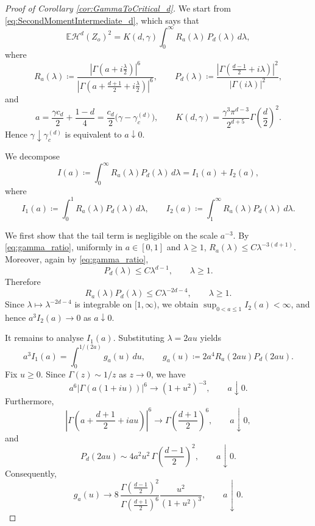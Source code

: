 \documentclass[10pt,a4paper]{amsart}
\def\EE{\mathbb{E}}
\def\cH{\mathcal{H}}
\begin{document}
\begin{proof}[Proof of Corollary \ref{cor:GammaToCritical_d}]
	 We start from \eqref{eq:SecondMomentIntermediate_d}, which says that
	\[
	\EE\cH^d(Z_o)^2
	=
	K(d,\gamma)\int_0^\infty R_a(\lambda)\,P_d(\lambda)\,d\lambda,
	\]
	where
	\[
	R_a(\lambda)\coloneqq
	\frac{\left| \Gamma\left(a + i\frac{\lambda}{2}\right) \right|^6}{
		\left| \Gamma\left(a + \frac{d+1}{2} + i\frac{\lambda}{2}\right) \right|^6},
	\qquad
	P_d(\lambda)\coloneqq
	\frac{\left| \Gamma\left(\frac{d-1}{2} + i\lambda\right) \right|^2}{
		\left| \Gamma(i\lambda) \right|^2},
	\]
	and
	\[
	a=\frac{\gamma c_d}{2}+\frac{1-d}{4}
	=\frac{c_d}{2}\bigl(\gamma-\gamma_c^{(d)}\bigr),
	\qquad
	K(d,\gamma)=\frac{\gamma^3\pi^{d-3}}{2^{d+5}}\Gamma\!\left(\frac d2\right)^2.
	\]
	Hence \(\gamma\downarrow \gamma_c^{(d)}\) is equivalent to \(a\downarrow 0\).

	We decompose
	\[
	I(a)\coloneqq\int_0^\infty R_a(\lambda)P_d(\lambda)\,d\lambda
	= I_1(a)+I_2(a),
	\]
	where
	\[
	I_1(a)\coloneqq\int_0^1 R_a(\lambda)P_d(\lambda)\,d\lambda,
	\qquad
	I_2(a)\coloneqq\int_1^\infty R_a(\lambda)P_d(\lambda)\,d\lambda.
	\]

	We first show that the tail term is negligible on the scale \(a^{-3}\).
	By \eqref{eq:gamma_ratio}, uniformly in \(a\in[0,1]\) and \(\lambda\ge1\),
	$
	R_a(\lambda)
	\le C \lambda^{-3(d+1)}
	$.	Moreover, again by \eqref{eq:gamma_ratio},
	\[
	P_d(\lambda)\le C\lambda^{d-1},\qquad \lambda\ge1.
	\]
	Therefore
	\[
	R_a(\lambda)P_d(\lambda)\le C\lambda^{-2d-4},\qquad \lambda\ge1.
	\]
	Since \(\lambda\mapsto \lambda^{-2d-4}\) is integrable on \([1,\infty)\), we obtain
	$\sup_{0<a\le1} I_2(a)<\infty$,
	and hence $a^3 I_2(a)\longrightarrow 0$ as $a\downarrow0$.

	It remains to analyse \(I_1(a)\). Substituting \(\lambda=2au\) yields
	\[
	a^3 I_1(a)=\int_0^{1/(2a)} g_a(u)\,du,
	\qquad
	g_a(u)\coloneqq 2a^4R_a(2au)P_d(2au).
	\]
	Fix \(u\ge0\). Since \(\Gamma(z)\sim 1/z\) as \(z\to0\), we have
	\[
	a^6\bigl|\Gamma(a(1+iu))\bigr|^6\longrightarrow (1+u^2)^{-3}, \qquad a\downarrow 0.
	\]
	Furthermore,
	\[
	\left|\Gamma\!\left(a+\frac{d+1}{2}+iau\right)\right|^6
	\longrightarrow
	\Gamma\!\left(\frac{d+1}{2}\right)^6, \qquad a\downarrow 0,
	\]
	and
	\[
	P_d(2au)\sim 4a^2u^2\,\Gamma\!\left(\frac{d-1}{2}\right)^2,\qquad a\downarrow 0.
	\]
	Consequently,
	\[
	g_a(u)\longrightarrow
	8\,\frac{\Gamma\!\left(\frac{d-1}{2}\right)^2}{
		\Gamma\!\left(\frac{d+1}{2}\right)^6}
	\frac{u^2}{(1+u^2)^3},\qquad a\downarrow 0.
	\]


\end{proof}
\end{document}
